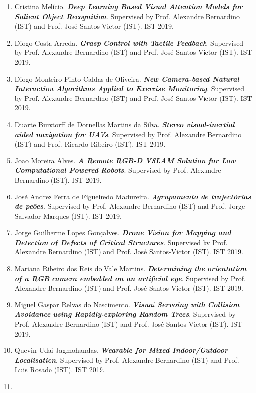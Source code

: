 \documentclass[
]{article}
\begin{document}
\begin{enumerate}
  Netherlands). IST 2019.
\item
  Cristina Melício. \emph{\textbf{Deep Learning Based Visual Attention
  Models for Salient Object Recognition}}. Supervised by Prof. Alexandre
  Bernardino (IST) and Prof. José Santos-Victor (IST). IST 2019.
\item
  Diogo Costa Arreda. \emph{\textbf{Grasp Control with Tactile
  Feedback}}. Supervised by Prof. Alexandre Bernardino (IST) and Prof.
  José Santos-Victor (IST). IST 2019.
\item
  Diogo Monteiro Pinto Caldas de Oliveira. \emph{\textbf{New
  Camera-based Natural Interaction Algorithms Applied to Exercise
  Monitoring}}. Supervised by Prof. Alexandre Bernardino (IST) and Prof.
  José Santos-Victor (IST). IST 2019.
\item
  Duarte Burstorff de Dornellas Martins da Silva. \emph{\textbf{Stereo
  visual-inertial aided navigation for UAVs}}. Supervised by Prof.
  Alexandre Bernardino (IST) and Prof. Ricardo Ribeiro (IST). IST 2019.
\item
  Joao Moreira Alves. \emph{\textbf{A Remote RGB-D VSLAM Solution for
  Low Computational Powered Robots}}. Supervised by Prof. Alexandre
  Bernardino (IST). IST 2019.
\item
  José Andrez Ferra de Figueiredo Madureira. \emph{\textbf{Agrupamento
  de trajectórias de peões}}. Supervised by Prof. Alexandre Bernardino
  (IST) and Prof. Jorge Salvador Marques (IST). IST 2019.
\item
  Jorge Guilherme Lopes Gonçalves. \emph{\textbf{Drone Vision for
  Mapping and Detection of Defects of Critical Structures}}. Supervised
  by Prof. Alexandre Bernardino (IST) and Prof. José Santos-Victor
  (IST). IST 2019.
\item
  Mariana Ribeiro dos Reis do Vale Martins. \emph{\textbf{Determining
  the orientation of a RGB camera embedded on an artificial eye}}.
  Supervised by Prof. Alexandre Bernardino (IST) and Prof. José
  Santos-Victor (IST). IST 2019.
\item
  Miguel Gaspar Relvas do Nascimento. \emph{\textbf{Visual Servoing with
  Collision Avoidance using Rapidly-exploring Random Trees}}. Supervised
  by Prof. Alexandre Bernardino (IST) and Prof. José Santos-Victor
  (IST). IST 2019.
\item
  Quevin Udai Jagmohandas. \emph{\textbf{Wearable for Mixed
  Indoor/Outdoor Localisation}}. Supervised by Prof. Alexandre
  Bernardino (IST) and Prof. Luis Rosado (IST). IST 2019.
\item

\end{enumerate}
\end{document}
